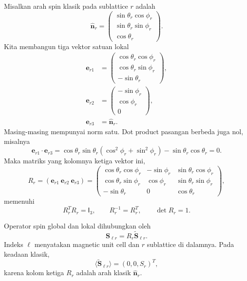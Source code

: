 \documentclass[11pt,a4paper]{article}
\newcommand{\vS}{\bm S}
\newcommand{\vn}{\widehat{\bm n}}
\newcommand{\identity}{\mathsf I}
\begin{document}
Misalkan arah spin klasik pada sublattice $r$ adalah
\begin{equation}
\vn_r=
\begin{pmatrix}
\sin\theta_r\cos\phi_r\\
\sin\theta_r\sin\phi_r\\
\cos\theta_r
\end{pmatrix}.
\label{eq:classical-direction}
\end{equation}
Kita membangun tiga vektor satuan lokal
\begin{align}
\bm e_{r1}&=
\begin{pmatrix}
\cos\theta_r\cos\phi_r\\
\cos\theta_r\sin\phi_r\\
-\sin\theta_r
\end{pmatrix},\\
\bm e_{r2}&=
\begin{pmatrix}
-\sin\phi_r\\
\cos\phi_r\\
0
\end{pmatrix},\\
\bm e_{r3}&=\vn_r.
\end{align}
Masing-masing mempunyai norm satu. Dot product pasangan berbeda juga nol, misalnya
\begin{equation}
\bm e_{r1}\cdot\bm e_{r3}
=\cos\theta_r\sin\theta_r(\cos^2\phi_r+\sin^2\phi_r)
-\sin\theta_r\cos\theta_r=0.
\end{equation}
Maka matriks yang kolomnya ketiga vektor ini,
\begin{equation}
R_r=(\bm e_{r1}\ \bm e_{r2}\ \bm e_{r3})
=
\begin{pmatrix}
\cos\theta_r\cos\phi_r&-\sin\phi_r&\sin\theta_r\cos\phi_r\\
\cos\theta_r\sin\phi_r&\cos\phi_r&\sin\theta_r\sin\phi_r\\
-\sin\theta_r&0&\cos\theta_r
\end{pmatrix},
\label{eq:rotation-matrix}
\end{equation}
memenuhi
\begin{equation}
R_r^TR_r=\identity_3,
\qquad R_r^{-1}=R_r^T,
\qquad \det R_r=1.
\end{equation}

Operator spin global dan lokal dihubungkan oleh
\begin{equation}
\vS_{\ell r}=R_r\widetilde{\vS}_{\ell r}.
\label{eq:global-local-spin}
\end{equation}
Indeks $\ell$ menyatakan magnetic unit cell dan $r$ sublattice di dalamnya. Pada keadaan klasik,
\begin{equation}
\langle\widetilde{\vS}_{\ell r}\rangle=(0,0,S_r)^T,
\end{equation}
karena kolom ketiga $R_r$ adalah arah klasik $\vn_r$.
\end{document}
